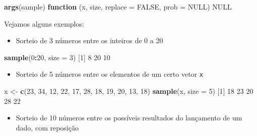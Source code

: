\documentclass[10pt,a4paper]{book}
\newenvironment{Shaded}{\begin{snugshade}}{\end{snugshade}}
\newcommand{\KeywordTok}[1]{\textcolor[rgb]{0.13,0.29,0.53}{\textbf{#1}}}
\newcommand{\DataTypeTok}[1]{\textcolor[rgb]{0.13,0.29,0.53}{#1}}
\newcommand{\DecValTok}[1]{\textcolor[rgb]{0.00,0.00,0.81}{#1}}
\newcommand{\StringTok}[1]{\textcolor[rgb]{0.31,0.60,0.02}{#1}}
\newcommand{\OtherTok}[1]{\textcolor[rgb]{0.56,0.35,0.01}{#1}}
\newcommand{\ControlFlowTok}[1]{\textcolor[rgb]{0.13,0.29,0.53}{\textbf{#1}}}
\newcommand{\OperatorTok}[1]{\textcolor[rgb]{0.81,0.36,0.00}{\textbf{#1}}}
\newcommand{\NormalTok}[1]{#1}
\providecommand{\tightlist}{%
  \setlength{\itemsep}{0pt}\setlength{\parskip}{0pt}}
\begin{document}
\begin{Shaded}
\begin{Highlighting}[]
\KeywordTok{args}\NormalTok{(sample)}
\ControlFlowTok{function}\NormalTok{ (x, size, }\DataTypeTok{replace =} \OtherTok{FALSE}\NormalTok{, }\DataTypeTok{prob =} \OtherTok{NULL}\NormalTok{) }
\OtherTok{NULL}
\end{Highlighting}
\end{Shaded}

Vejamos alguns exemplos:

\begin{itemize}
\tightlist
\item
  Sorteio de 3 números entre os inteiros de 0 a 20
\end{itemize}

\begin{Shaded}
\begin{Highlighting}[]
\KeywordTok{sample}\NormalTok{(}\DecValTok{0}\OperatorTok{:}\DecValTok{20}\NormalTok{, }\DataTypeTok{size =} \DecValTok{3}\NormalTok{)}
\NormalTok{[}\DecValTok{1}\NormalTok{]  }\DecValTok{8} \DecValTok{20} \DecValTok{10}
\end{Highlighting}
\end{Shaded}

\begin{itemize}
\tightlist
\item
  Sorteio de 5 números entre os elementos de um certo vetor \texttt{x}
\end{itemize}

\begin{Shaded}
\begin{Highlighting}[]
\NormalTok{x <-}\StringTok{ }\KeywordTok{c}\NormalTok{(}\DecValTok{23}\NormalTok{, }\DecValTok{34}\NormalTok{, }\DecValTok{12}\NormalTok{, }\DecValTok{22}\NormalTok{, }\DecValTok{17}\NormalTok{, }\DecValTok{28}\NormalTok{, }\DecValTok{18}\NormalTok{, }\DecValTok{19}\NormalTok{, }\DecValTok{20}\NormalTok{, }\DecValTok{13}\NormalTok{, }\DecValTok{18}\NormalTok{)}
\KeywordTok{sample}\NormalTok{(x, }\DataTypeTok{size =} \DecValTok{5}\NormalTok{)}
\NormalTok{[}\DecValTok{1}\NormalTok{] }\DecValTok{18} \DecValTok{23} \DecValTok{20} \DecValTok{28} \DecValTok{22}
\end{Highlighting}
\end{Shaded}

\begin{itemize}
\tightlist
\item
  Sorteio de 10 números entre os possíveis resultados do lançamento de
  um dado, com reposição
\end{itemize}
\end{document}
